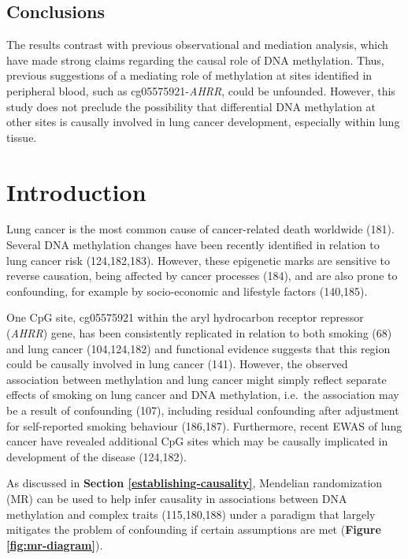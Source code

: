 \documentclass[11pt,oneside]{bristolthesis}
\begin{document}
\hypertarget{abstract-conclusions-07}{%
\subsection{Conclusions}\label{abstract-conclusions-07}}

The results contrast with previous observational and mediation analysis, which have made strong claims regarding the causal role of DNA methylation. Thus, previous suggestions of a mediating role of methylation at sites identified in peripheral blood, such as cg05575921-\emph{AHRR}, could be unfounded. However, this study does not preclude the possibility that differential DNA methylation at other sites is causally involved in lung cancer development, especially within lung tissue.

\hypertarget{introduction-07}{%
\section{Introduction}\label{introduction-07}}

Lung cancer is the most common cause of cancer-related death worldwide (181). Several DNA methylation changes have been recently identified in relation to lung cancer risk (124,182,183). However, these epigenetic marks are sensitive to reverse causation, being affected by cancer processes (184), and are also prone to confounding, for example by socio-economic and lifestyle factors (140,185).

One CpG site, cg05575921 within the aryl hydrocarbon receptor repressor (\emph{AHRR}) gene, has been consistently replicated in relation to both smoking (68) and lung cancer (104,124,182) and functional evidence suggests that this region could be causally involved in lung cancer (141). However, the observed association between methylation and lung cancer might simply reflect separate effects of smoking on lung cancer and DNA methylation, i.e.~the association may be a result of confounding (107), including residual confounding after adjustment for self-reported smoking behaviour (186,187). Furthermore, recent EWAS of lung cancer have revealed additional CpG sites which may be causally implicated in development of the disease (124,182).

As discussed in \textbf{Section \ref{establishing-causality}}, Mendelian randomization (MR) can be used to help infer causality in associations between DNA methylation and complex traits (115,180,188) under a paradigm that largely mitigates the problem of confounding if certain assumptions are met (\textbf{Figure \ref{fig:mr-diagram}}).
\end{document}
